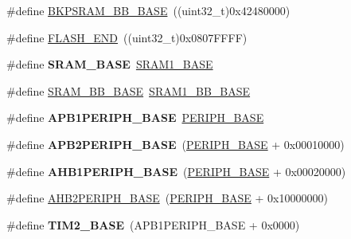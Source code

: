\begin{DoxyCompactItemize}
\item 
\#define \hyperlink{group___peripheral__memory__map_gaee19a30c9fa326bb10b547e4eaf4e250}{B\+K\+P\+S\+R\+A\+M\+\_\+\+B\+B\+\_\+\+B\+A\+SE}~((uint32\+\_\+t)0x42480000)
\item 
\#define \hyperlink{group___peripheral__memory__map_ga8be554f354e5aa65370f6db63d4f3ee4}{F\+L\+A\+S\+H\+\_\+\+E\+ND}~((uint32\+\_\+t)0x0807\+F\+F\+F\+F)
\item 
\#define {\bfseries S\+R\+A\+M\+\_\+\+B\+A\+SE}~\hyperlink{group___peripheral__memory__map_ga7d0fbfb8894012dbbb96754b95e562cd}{S\+R\+A\+M1\+\_\+\+B\+A\+SE}\hypertarget{group___peripheral__memory__map_ga05e8f3d2e5868754a7cd88614955aecc}{}\label{group___peripheral__memory__map_ga05e8f3d2e5868754a7cd88614955aecc}

\item 
\#define \hyperlink{group___peripheral__memory__map_gad3548b6e2f017f39d399358f3ac98454}{S\+R\+A\+M\+\_\+\+B\+B\+\_\+\+B\+A\+SE}~\hyperlink{group___peripheral__memory__map_gac4c4f61082e4b168f29d9cf97dc3ca5c}{S\+R\+A\+M1\+\_\+\+B\+B\+\_\+\+B\+A\+SE}
\item 
\#define {\bfseries A\+P\+B1\+P\+E\+R\+I\+P\+H\+\_\+\+B\+A\+SE}~\hyperlink{group___peripheral__memory__map_ga9171f49478fa86d932f89e78e73b88b0}{P\+E\+R\+I\+P\+H\+\_\+\+B\+A\+SE}\hypertarget{group___peripheral__memory__map_ga45666d911f39addd4c8c0a0ac3388cfb}{}\label{group___peripheral__memory__map_ga45666d911f39addd4c8c0a0ac3388cfb}

\item 
\#define {\bfseries A\+P\+B2\+P\+E\+R\+I\+P\+H\+\_\+\+B\+A\+SE}~(\hyperlink{group___peripheral__memory__map_ga9171f49478fa86d932f89e78e73b88b0}{P\+E\+R\+I\+P\+H\+\_\+\+B\+A\+SE} + 0x00010000)\hypertarget{group___peripheral__memory__map_ga25b99d6065f1c8f751e78f43ade652cb}{}\label{group___peripheral__memory__map_ga25b99d6065f1c8f751e78f43ade652cb}

\item 
\#define {\bfseries A\+H\+B1\+P\+E\+R\+I\+P\+H\+\_\+\+B\+A\+SE}~(\hyperlink{group___peripheral__memory__map_ga9171f49478fa86d932f89e78e73b88b0}{P\+E\+R\+I\+P\+H\+\_\+\+B\+A\+SE} + 0x00020000)\hypertarget{group___peripheral__memory__map_ga811a9a4ca17f0a50354a9169541d56c4}{}\label{group___peripheral__memory__map_ga811a9a4ca17f0a50354a9169541d56c4}

\item 
\#define \hyperlink{group___peripheral__memory__map_gaeedaa71d22a1948492365e2cd26cfd46}{A\+H\+B2\+P\+E\+R\+I\+P\+H\+\_\+\+B\+A\+SE}~(\hyperlink{group___peripheral__memory__map_ga9171f49478fa86d932f89e78e73b88b0}{P\+E\+R\+I\+P\+H\+\_\+\+B\+A\+SE} + 0x10000000)
\item 
\#define {\bfseries T\+I\+M2\+\_\+\+B\+A\+SE}~(A\+P\+B1\+P\+E\+R\+I\+P\+H\+\_\+\+B\+A\+SE + 0x0000)\hypertarget{group___peripheral__memory__map_ga00d0fe6ad532ab32f0f81cafca8d3aa5}{}\label{group___peripheral__memory__map_ga00d0fe6ad532ab32f0f81cafca8d3aa5}


\end{DoxyCompactItemize}

